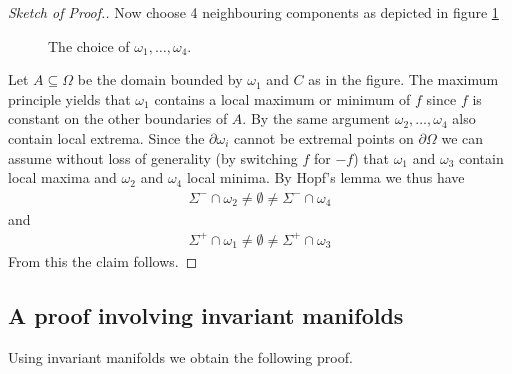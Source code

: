 \begin{proof}[Sketch of Proof.]
  Now choose 4 neighbouring components as depicted in figure \ref{fi:n2:levelSets:neighbouringComponents}
  \begin{figure}
    \centering
    \caption{The choice of $\omega_1,\dots,\omega_4$.}
    \label{fi:n2:levelSets:neighbouringComponents}
  \end{figure}
  Let $A\subseteq\Omega$ be the domain bounded
  by $\omega_1$ and $C$ as in the figure. The maximum principle yields that $\omega_1$ contains a local maximum or minimum of $f$ since
  $f$ is constant on the other boundaries of $A$.
  By the same argument $\omega_2,\dots,\omega_4$ also contain local extrema. 
  Since the $\partial\omega_i$ cannot be extremal points on $\partial\Omega$
  we can assume without loss of generality (by switching $f$ for $-f$) that $\omega_1$ and $\omega_3$ contain local maxima and $\omega_2 $ and $\omega_4$ local
  minima. By Hopf's lemma we thus have
  \begin{align*}
    \Sigma^-\cap\omega_2\neq\emptyset\neq\Sigma^-\cap\omega_4
  \end{align*}
  and 
  \begin{align*}
    \Sigma^+\cap\omega_1\neq\emptyset\neq\Sigma^+\cap\omega_3
  \end{align*}
  From this the claim follows.
\end{proof}

\subsection{A proof involving invariant manifolds}

Using invariant manifolds we obtain the following proof.

